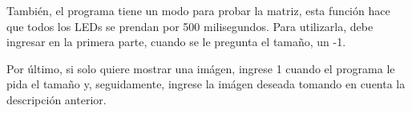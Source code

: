 \documentclass{article}
\begin{document}
\par También, el programa tiene un modo para probar la matriz, esta función hace que todos los LEDs se prendan por 500 milisegundos. Para utilizarla, debe ingresar en la primera parte, cuando se le pregunta el tamaño, un -1.
\par Por último, si solo quiere mostrar una imágen, ingrese 1 cuando el programa le pida el tamaño y, seguidamente, ingrese la imágen deseada tomando en cuenta la descripción anterior.
\end{document}
